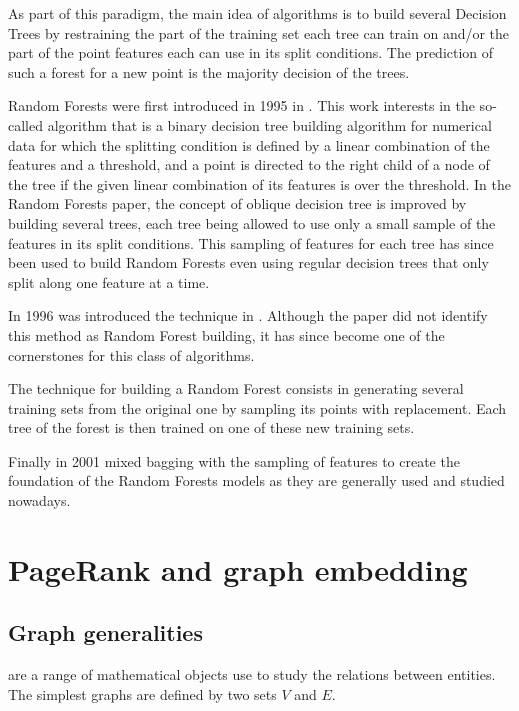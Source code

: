 As part of this paradigm, the main idea of  algorithms is to build several Decision Trees by restraining the part of the training set each tree can train on and/or the part of the point features each can use in its split conditions. The prediction of such a forest for a new point is the majority decision of the trees.

Random Forests were first introduced in 1995 in \cite{ho1995_RandomDecisionForests}. This work interests in the so-called  algorithm that is a binary decision tree building algorithm for numerical data for which the splitting condition is defined by a linear combination of the features and a threshold, and a point is directed to the right child of a node of the tree if the given linear combination of its features is over the threshold. In the Random Forests paper, the concept of oblique decision tree is improved by building several trees, each tree being allowed to use only a small sample of the features in its split conditions. This sampling of features for each tree has since been used to build Random Forests even using regular decision trees that only split along one feature at a time.

In 1996 was introduced the  technique in \cite{breiman1996_BaggingPredictors}. Although the paper did not identify this method as Random Forest building, it has since become one of the cornerstones for this class of algorithms.

\begin{definition}[Bagging]
    The  technique for building a Random Forest consists in generating several training sets from the original one by sampling its points with replacement. Each tree of the forest is then trained on one of these new training sets.
\end{definition}

Finally in 2001 \cite{breiman2001_RandomForests} mixed bagging with the sampling of features to create the foundation of the Random Forests models as they are generally used and studied nowadays.

\section{PageRank and graph embedding}

\subsection{Graph generalities}
 are a range of mathematical objects use to study the relations between entities. The simplest graphs are defined by two sets $V$ and $E$. 

